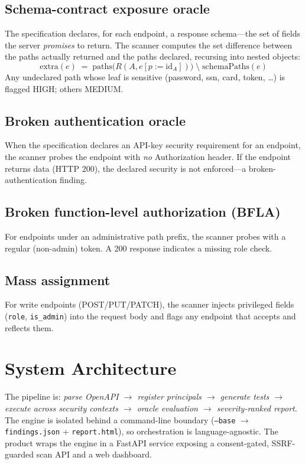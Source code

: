 \documentclass[conference]{IEEEtran}
\begin{document}
\subsection{Schema-contract exposure oracle}
The specification declares, for each endpoint, a response schema---the set of
fields the server \emph{promises} to return. The scanner computes the set
difference between the paths actually returned and the paths declared, recursing
into nested objects:
\begin{equation}
\mathrm{extra}(e) \;=\;
\mathrm{paths}\big(R(A, e[p{:=}\mathrm{id}_A])\big)
\;\setminus\; \mathrm{schemaPaths}(e)
\end{equation}
Any undeclared path whose leaf is sensitive (password, ssn, card, token,
\ldots) is flagged HIGH; others MEDIUM.

\subsection{Broken authentication oracle}
When the specification declares an API-key security requirement for an endpoint,
the scanner probes the endpoint with \emph{no} Authorization header. If the
endpoint returns data (HTTP 200), the declared security is not enforced---a
broken-authentication finding.

\subsection{Broken function-level authorization (BFLA)}
For endpoints under an administrative path prefix, the scanner probes with a
regular (non-admin) token. A 200 response indicates a missing role check.

\subsection{Mass assignment}
For write endpoints (POST/PUT/PATCH), the scanner injects privileged fields
(\texttt{role}, \texttt{is\_admin}) into the request body and flags any endpoint
that accepts and reflects them.

\section{System Architecture}
The pipeline is: \emph{parse OpenAPI $\rightarrow$ register principals
$\rightarrow$ generate tests $\rightarrow$ execute across security contexts
$\rightarrow$ oracle evaluation $\rightarrow$ severity-ranked report}. The engine
is isolated behind a command-line boundary (\texttt{--base} $\rightarrow$
\texttt{findings.json} + \texttt{report.html}), so orchestration is
language-agnostic. The product wraps the engine in a FastAPI service exposing a
consent-gated, SSRF-guarded scan API and a web dashboard.
\end{document}
